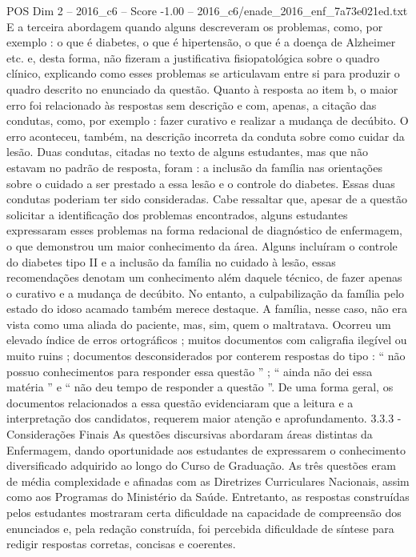 \begin{textsample}{POS Dim 2 – 2016\_c6 – Score -1.00 – 2016\_c6/enade\_2016\_enf\_7a73e021ed.txt}
E a terceira abordagem quando alguns descreveram os problemas, como, por exemplo : o que é diabetes, o que é hipertensão, o que é a doença de Alzheimer etc. e, desta forma, não fizeram a justificativa fisiopatológica sobre o quadro clínico, explicando como esses problemas se articulavam entre si para produzir o quadro descrito no enunciado da questão.
Quanto à resposta ao item b, o maior erro foi relacionado às respostas sem descrição e com, apenas, a citação das condutas, como, por exemplo : fazer curativo e realizar a mudança de decúbito.
O erro aconteceu, também, na descrição incorreta da conduta sobre como cuidar da lesão.
Duas condutas, citadas no texto de alguns estudantes, mas que não estavam no padrão de resposta, foram : a inclusão da família nas orientações sobre o cuidado a ser prestado a essa lesão e o controle do diabetes.
Essas duas condutas poderiam ter sido consideradas.
Cabe ressaltar que, apesar de a questão solicitar a identificação dos problemas encontrados, alguns estudantes expressaram esses problemas na forma redacional de diagnóstico de enfermagem, o que demonstrou um maior conhecimento da área.
Alguns incluíram o controle do diabetes tipo II e a inclusão da família no cuidado à lesão, essas recomendações denotam um conhecimento além daquele técnico, de fazer apenas o curativo e a mudança de decúbito.
No entanto, a culpabilização da família pelo estado do idoso acamado também merece destaque.
A família, nesse caso, não era vista como uma aliada do paciente, mas, sim, quem o maltratava.
Ocorreu um elevado índice de erros ortográficos ; muitos documentos com caligrafia ilegível ou muito ruins ; documentos desconsiderados por conterem respostas do tipo : “ não possuo conhecimentos para responder essa questão ” ; “ ainda não dei essa matéria ” e “ não deu tempo de responder a questão ”.
De uma forma geral, os documentos relacionados a essa questão evidenciaram que a leitura e a interpretação dos candidatos, requerem maior atenção e aprofundamento. 3.3.3 - Considerações Finais As questões discursivas abordaram áreas distintas da Enfermagem, dando oportunidade aos estudantes de expressarem o conhecimento diversificado adquirido ao longo do Curso de Graduação.
As três questões eram de média complexidade e afinadas com as Diretrizes Curriculares Nacionais, assim como aos Programas do Ministério da Saúde.
Entretanto, as respostas construídas pelos estudantes mostraram certa dificuldade na capacidade de compreensão dos enunciados e, pela redação construída, foi percebida dificuldade de síntese para redigir respostas corretas, concisas e coerentes.

\end{textsample}
